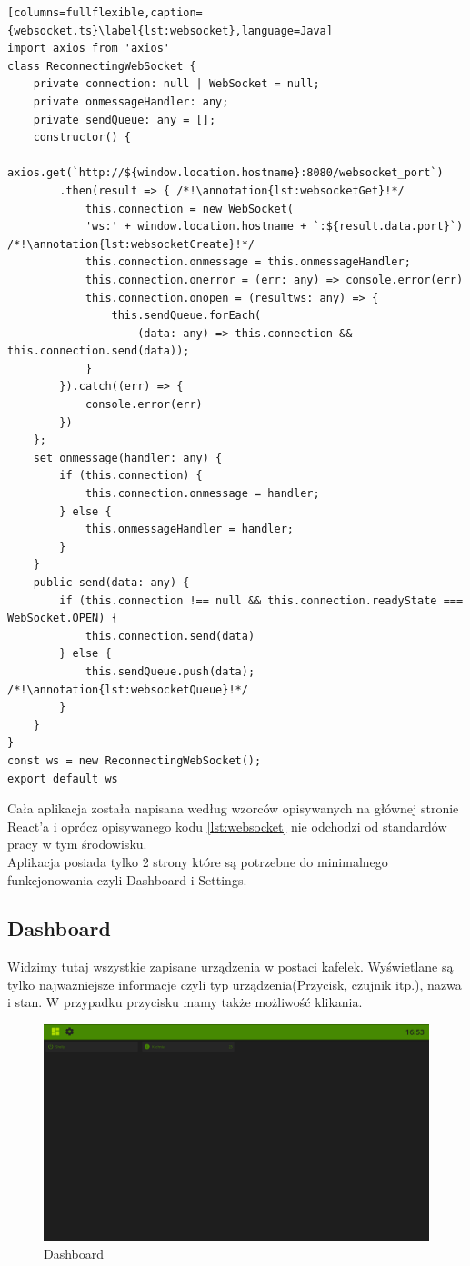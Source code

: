 \begin{lstlisting}[columns=fullflexible,caption={websocket.ts}\label{lst:websocket},language=Java]
import axios from 'axios'
class ReconnectingWebSocket {
    private connection: null | WebSocket = null;
    private onmessageHandler: any;
    private sendQueue: any = [];
    constructor() {
        axios.get(`http://${window.location.hostname}:8080/websocket_port`)
        .then(result => { /*!\annotation{lst:websocketGet}!*/
            this.connection = new WebSocket(
            'ws:' + window.location.hostname + `:${result.data.port}`) /*!\annotation{lst:websocketCreate}!*/
            this.connection.onmessage = this.onmessageHandler;
            this.connection.onerror = (err: any) => console.error(err)
            this.connection.onopen = (resultws: any) => {
                this.sendQueue.forEach(
                    (data: any) => this.connection && this.connection.send(data));
            }
        }).catch((err) => {
            console.error(err)
        })
    };
    set onmessage(handler: any) {
        if (this.connection) {
            this.connection.onmessage = handler;
        } else {
            this.onmessageHandler = handler;
        }
    }
    public send(data: any) {
        if (this.connection !== null && this.connection.readyState === WebSocket.OPEN) {
            this.connection.send(data)
        } else {
            this.sendQueue.push(data); /*!\annotation{lst:websocketQueue}!*/
        }
    }
}
const ws = new ReconnectingWebSocket();
export default ws
\end{lstlisting} \newpage
\par Cała aplikacja została napisana według wzorców opisywanych na głównej stronie React'a i oprócz opisywanego kodu \ref{lst:websocket} nie odchodzi od standardów pracy w tym środowisku. \\
Aplikacja posiada tylko 2 strony które są potrzebne do minimalnego funkcjonowania czyli Dashboard i Settings.
\subsection{Dashboard}
Widzimy tutaj wszystkie zapisane urządzenia w postaci kafelek. Wyświetlane są tylko najważniejsze informacje czyli typ urządzenia(Przycisk, czujnik itp.), nazwa i stan. W przypadku przycisku mamy także możliwość klikania. 
\begin{figure}[h]
  \includegraphics[width=\linewidth]{dashboard.png}
  \caption{Dashboard}
  \label{fig:dashboard}
\end{figure}
\newpage

